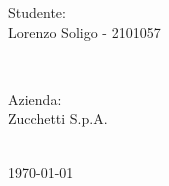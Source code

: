 \begin{titlepage}
    \vspace{1.5cm}
    
    \begin{minipage}{0.4\textwidth}
        \begin{flushleft} \large
            Studente:\\
            Lorenzo Soligo  - 2101057
        \end{flushleft}
    \end{minipage}
    ~
    \begin{minipage}{0.4\textwidth}
        \begin{flushright} \large
            Azienda: \\
            Zucchetti S.p.A.
        \end{flushright}
    \end{minipage}\\[2cm]
    
    
    {\large \today}\\[2cm]
    
    
    \vfill 
    
\end{titlepage}
